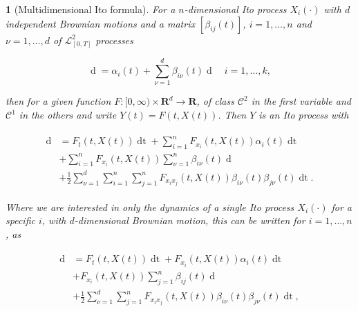 \documentclass[british]{amsart} \usepackage{lmodern}
\numberwithin{equation}{section} \numberwithin{figure}{section}
\theoremstyle{plain} \newtheorem{thm}{\protect\theoremname}[section]
\theoremstyle{definition} \newtheorem{defn}[thm]{\protect\definitionname}
\theoremstyle{plain} \newtheorem{assumption}[thm]{\protect\assumptionname}
\theoremstyle{plain} \newtheorem{lem}[thm]{\protect\lemmaname}
\theoremstyle{plain} \newtheorem{prop}[thm]{\protect\propositionname}
\theoremstyle{remark} \newtheorem{rem}[thm]{\protect\remarkname}
\theoremstyle{plain} \newtheorem{cor}[thm]{\protect\corollaryname}
\renewcommand{\d}[1]{\mathop{\mathrm{d}{#1}}}
\newcommand{\rangei}{i=1,\dots,n} \newcommand{\measure}{\mathbb{P}}
\begin{document}
\begin{thm} [Multidimensional Ito formula]

  For a $n$-dimensional Ito process $X_{i}(\cdot)$ with $d$ independent Brownian motions and a
  matrix $[\beta_{ij}(t)]$, $i=1,\dots,n$ and $\nu=1,\dots,d$ of $\mathcal{L}_{[0,T]}^{2}$ processes

  \begin{equation}
    \d{X_{i}(t)} = \alpha_i(t) + \sum_{\nu=1}^d \beta_{i\nu}(t)\d{W_{\nu}(t)}
    \quad i=1,\dots,k,
  \end{equation}

  then for a given function $F:[0,\infty) \times \mathbf{R}^d \to \mathbf{R}$, of
  class $\mathcal{C}^2$ in the first variable and $\mathcal{C}^1$ in the others
  and write $Y(t)=F(t,X(t))$. Then $Y$ is an Ito process with

   \begin{gather}
    \begin{split}
    \d{Y(t)} &= F_{t}(t, X(t))\d{t} + \sum_{i=1}^n F_{x_{i}}(t,X(t)) \alpha_{i}(t)\d{t} \\
             & + \sum_{i=1}^n F_{x_{i}}(t,X(t)) \sum_{\nu=1}^n \beta_{i\nu}(t)\d{W_{\nu}(t)} \\
             & + \frac{1}{2} \sum_{\nu=1}^d \sum_{i=1}^n \sum_{j=1}^n
                  F_{x_{i}x_{j}}(t,X(t)) \beta_{i\nu}(t) \beta_{j\nu}(t)\d{t}.
    \end{split}
  \end{gather}

  Where we are interested in only the dynamics of a single Ito process
  $X_{i}(\cdot)$ for a specific $i$, with $d$-dimensional Brownian motion, this
  can be written for $\rangei$, as

  \begin{gather}
    \begin{split}
    \d{Y(t)} &= F_{t}(t, X(t))\d{t} + F_{x_{i}}(t,X(t)) \alpha_{i}(t)\d{t} \\
             & + F_{x_{i}}(t,X(t)) \sum_{j=1}^n \beta_{ij}(t)\d{W_{j}(t)} \\
             & + \frac{1}{2} \sum_{\nu=1}^d \sum_{j=1}^n F_{x_{i}x_{j}}(t,X(t))
                \beta_{i\nu}(t) \beta_{j\nu}(t)\d{t},\\
    \end{split}
  \end{gather}


\end{thm}

\newpage
\end{document}
